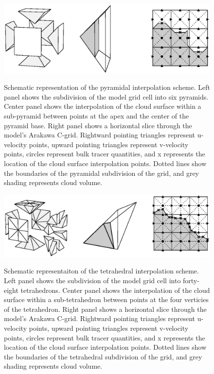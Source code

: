 \documentclass[12pt]{article}
\begin{document}
\begin{figure}[t]
  \noindent\includegraphics[width=40pc,angle=0]{./figures/pyramid_scheme.eps}\\
  \caption{Schematic representation of the pyramidal interpolation scheme.
Left panel shows the subdivision of the model grid cell into six pyramids.  
Center panel shows the interpolation of the cloud surface within a 
sub-pyramid between points at the  apex and the center of the pyramid base.  
Right panel shows a horizontal slice through the model's Arakawa C-grid.  
Rightward pointing triangles represent u-velocity points, upward pointing 
triangles represent v-velocity points, circles represent bulk tracer 
quantities, and x represents the location of the cloud surface interpolation
points.  Dotted lines show the boundaries of the pyramidal subdivision of the 
grid, and grey shading represents cloud volume.}\label{fig:pyramid_scheme}
\end{figure}

\begin{figure}[t]
  \noindent\includegraphics[width=40pc,angle=0]{./figures/tetrahedral_scheme.eps}\\
  \caption{Schematic representaiton of the tetrahedral interpolation 
scheme.  Left panel shows the subdivision of the model grid cell into forty-
eight tetrahedrons.  Center panel shows the interpolation of the cloud surface
within a sub-tetrahedron between points at the four verticies of the 
tetrahedron.  Right panel shows a horizontal slice through the model's Arakawa 
C-grid.  Rightward pointing triangles represent u-velocity points, upward 
pointing triangles represent v-velocity points, circles represent bulk tracer
quantities, and x represents the location of the cloud surface interpolation
points.  Dotted lines show the boundaries of the tetrahedral subdivision of the 
grid, and grey shading represents cloud volume.}\label{fig:tetrahedral_scheme}
\end{figure}
\end{document}
